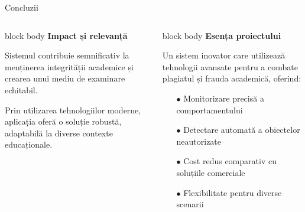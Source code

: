 \documentclass[aspectratio=169,9pt]{beamer}
\begin{document}
\begin{frame}{Concluzii}
\begin{columns}
                        \begin{beamercolorbox}[rounded=true,shadow=true,sep=0.7em]{block body}
                                \centering\textcolor{mainblue}{\textbf{\small Impact și relevanță}}
                                \vspace{0.1cm}
                                
                                \footnotesize
                                Sistemul contribuie semnificativ la menținerea integrității academice și crearea unui mediu de examinare echitabil.
                                
                                \vspace{0.2cm}
                                
                                Prin utilizarea tehnologiilor moderne, aplicația oferă o soluție robustă, adaptabilă la diverse contexte educaționale.
                        \end{beamercolorbox}
                        
                        \begin{beamercolorbox}[rounded=true,shadow=true,sep=0.7em]{block body}
                                \centering\textcolor{mainblue}{\textbf{\small Esența proiectului}}
                                \vspace{0.2cm}
                                
                                \footnotesize
                                Un sistem inovator care utilizează tehnologii avansate pentru a combate plagiatul și frauda academică, oferind:
                                
                                \vspace{0.2cm}
                                
                                \begin{itemize}[leftmargin=0.5cm, itemsep=0.05cm]
                                        \item[\textcolor{mainblue}{$\bullet$}] Monitorizare precisă a comportamentului
                                        \item[\textcolor{mainblue}{$\bullet$}] Detectare automată a obiectelor neautorizate
                                        \item[\textcolor{mainblue}{$\bullet$}] Cost redus comparativ cu soluțiile comerciale
                                        \item[\textcolor{mainblue}{$\bullet$}] Flexibilitate pentru diverse scenarii
                                \end{itemize}
                                

\end{beamercolorbox}
\end{columns}
\end{frame}
\end{document}
